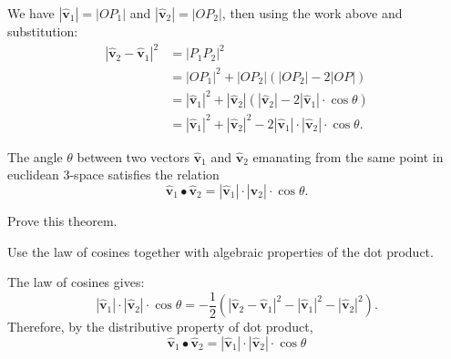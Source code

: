 \documentclass[newpage,hints,handout]{ximera}
\begin{document}
\begin{problem}
\begin{enumerate}
\begin{freeResponse}
  We have $|\hat{\mathbf v}_{1}|=|OP_{1}|$ and $|\hat{\mathbf v}_{2}|=|OP_{2}|$,
  then using the work above and substitution:
  \begin{align*} 
    |\hat{\mathbf v}_{2} - \hat{\mathbf v}_{1}|^2 &= |P_{1}P_{2}|^{2}\\
    &=|OP_{1}|^{2}+|OP_{2}| \left(|OP_{2}| -2| OP| \right)\\
    &=|\hat{\mathbf v}_{1}|^2 + |\hat{\mathbf v}_{2}|
    \left(|\hat{\mathbf v}_{2}|-2|\hat{\mathbf v}_{1}| \cdot\cos\theta \right) \\
    &=|\hat{\mathbf v}_{1}|^2 +|\hat{\mathbf v}_{2}|^2
    -2|\hat{\mathbf v}_{1}| \cdot |\hat{\mathbf v}_{2}| \cdot\cos\theta.
\end{align*}
\end{freeResponse}

\end{enumerate}
\end{problem}




\begin{theorem}
\label{111}The angle $\theta$ between two vectors $\hat{\mathbf v}_{1}$ and
$\hat{\mathbf v}_{2}$ emanating from the same point in euclidean $3$-space
satisfies the relation
\begin{equation}
  \hat{\mathbf v}_{1}\bullet\hat{\mathbf v}_{2}
  =\left\vert \hat{\mathbf v}_{1}\right\vert \cdot
  \left\vert \hat{\mathbf v}_{2}\right\vert \cdot\cos\theta. \label{2}%
\end{equation}
\end{theorem}


\begin{problem}
  Prove this theorem.
  \begin{hint}
    Use the law of cosines together with algebraic properties of the dot
    product.
  \end{hint}
\begin{freeResponse}
The law of cosines gives:
\[
|\hat{\mathbf v}_{1}|\cdot|\hat{\mathbf v}_{2}|\cdot\cos\theta
= -\frac{1}{2}\left(|\hat{\mathbf v}_{2}-\hat{\mathbf v}_{1}|^2 -|\hat{\mathbf v}_{1}|^2 - |\hat{\mathbf v}_{2}|^2\right).
\]
Therefore, by the distributive property of dot product,
\[
\hat{\mathbf v}_{1}\bullet\hat{\mathbf v}_{2} = |\hat{\mathbf v}_{1}|\cdot|\hat{\mathbf v}_{2}|\cdot\cos\theta
\]
\end{freeResponse} 
\end{problem}
\end{document}
